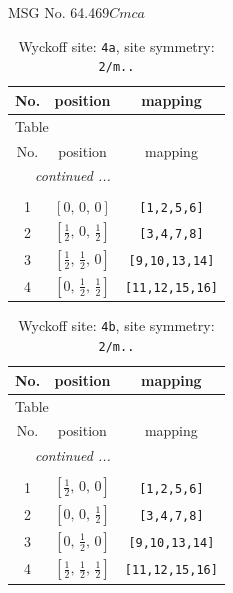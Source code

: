 \documentclass[fleqn,8pt]{jsarticle}
\begin{document}
\setcounter{MaxMatrixCols}{32}

\renewcommand{\tablename}{Table~}
\renewcommand{\figurename}{Figure~}
\begin{center}
\LARGE
MSG No. 64.469\quad$Cmca$
\end{center}
\renewcommand{\arraystretch}{1.2}
\begin{longtable}{ccc}
\caption{Wyckoff site: {\tt 4a}, site symmetry: {\tt 2/m..}}
 \\
 \hline \hline
No. & position & mapping \\ \hline \endfirsthead

\multicolumn{2}{l}{\tablename\ \thetable{}} \\
 \hline \hline
No. & position & mapping \\ \hline \endhead

 \hline \hline
\multicolumn{2}{r}{\footnotesize\it continued ...} \\ \endfoot

 \hline \hline
\multicolumn{2}{r}{} \\ \endlastfoot

1 & $\left[ 0,\, 0,\, 0 \right]$ & {\tt [1,2,5,6]} \\ \hline
2 & $\left[ \frac{1}{2},\, 0,\, \frac{1}{2} \right]$ & {\tt [3,4,7,8]} \\ \hline
3 & $\left[ \frac{1}{2},\, \frac{1}{2},\, 0 \right]$ & {\tt [9,10,13,14]} \\ \hline
4 & $\left[ 0,\, \frac{1}{2},\, \frac{1}{2} \right]$ & {\tt [11,12,15,16]} \\
\end{longtable}
\renewcommand{\arraystretch}{1.2}
\begin{longtable}{ccc}
\caption{Wyckoff site: {\tt 4b}, site symmetry: {\tt 2/m..}}
 \\
 \hline \hline
No. & position & mapping \\ \hline \endfirsthead

\multicolumn{2}{l}{\tablename\ \thetable{}} \\
 \hline \hline
No. & position & mapping \\ \hline \endhead

 \hline \hline
\multicolumn{2}{r}{\footnotesize\it continued ...} \\ \endfoot

 \hline \hline
\multicolumn{2}{r}{} \\ \endlastfoot

1 & $\left[ \frac{1}{2},\, 0,\, 0 \right]$ & {\tt [1,2,5,6]} \\ \hline
2 & $\left[ 0,\, 0,\, \frac{1}{2} \right]$ & {\tt [3,4,7,8]} \\ \hline
3 & $\left[ 0,\, \frac{1}{2},\, 0 \right]$ & {\tt [9,10,13,14]} \\ \hline
4 & $\left[ \frac{1}{2},\, \frac{1}{2},\, \frac{1}{2} \right]$ & {\tt [11,12,15,16]} \\
\end{longtable}
\end{document}
